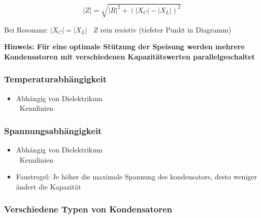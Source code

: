\begin{minipage}[c]{0.52\columnwidth}
    $$ \boxed{ |Z| = \sqrt{|R|^2 + (|X_{C}| - |X_L|)^2 } } $$
\end{minipage}
\hfill
\begin{minipage}[c]{0.46\columnwidth}
    Bei Resonanz: $ |X_C| = |X_L|$ \textrightarrow\ $Z$ rein resistiv (tiefster Punkt in Diagramm)
\end{minipage}

\vspace{0.2cm}
\textbf{Hinweis: Für eine optimale Stützung der Speisung werden mehrere Kondensatoren mit verschiedenen Kapazitätswerten parallelgeschaltet}


\begin{minipage}[t]{0.48\columnwidth}
    \subsubsection{Temperaturabhängigkeit}

    \begin{itemize}
        \item Abhängig von Dielektrikum \\
            \textrightarrow\ Kennlinien
    \end{itemize}
\end{minipage}
\hfill
\begin{minipage}[t]{0.48\columnwidth}
    \subsubsection{Spannungsabhängigkeit}

    \begin{itemize}
        \item Abhängig von Dielektrikum \\
            \textrightarrow\ Kennlinien
        \item Faustregel: Je höher die maximale Spannung des kondensators, desto weniger ändert 
            die Kapazität
    \end{itemize}
\end{minipage}


\subsubsection{Verschiedene Typen von Kondensatoren}

